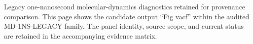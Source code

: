 Legacy one-nanosecond molecular-dynamics diagnostics retained for provenance comparison. This page shows the candidate output ``Fig vacf'' within the audited MD-1NS-LEGACY family. The panel identity, source scope, and current status are retained in the accompanying evidence matrix.
